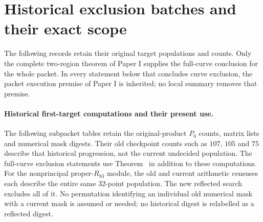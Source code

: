 \section{Historical exclusion batches and their exact scope}
The following records retain their original target populations and counts.
Only the complete two-region theorem of Paper I supplies the full-curve
conclusion for the whole packet. In every statement below that concludes
curve exclusion, the packet execution premise of Paper I is inherited;
no local summary removes that premise.

\paragraph{Historical first-target computations and their present use.}
The following subpacket tables retain the original-product $P_0$ counts,
matrix lists and numerical mask digests. Their old checkpoint counts
such as $107$, $105$ and $75$ describe that historical progression, not
the current undecided population. The full-curve exclusion statements
use Theorem~ in addition to these computations.
For the nonprincipal proper-$R_{83}$ module, the old and current
arithmetic censuses each describe the entire same $32$-point population.
The new reflected search excludes all of it. No permutation identifying
an individual old numerical mask with a current mask is assumed or
needed; no historical digest is relabelled as a reflected digest.

